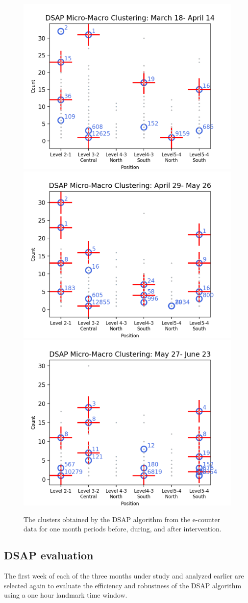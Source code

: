 \begin{figure}[!t]
    \centering
    \includegraphics[width=.47\textwidth]{image/Chapters/Chapter6/BeforeInte1month.png}
    \includegraphics[width=.47\textwidth]{image/Chapters/Chapter6/duringInte1month.png}
    \includegraphics[width=.47\textwidth]{image/Chapters/Chapter6/afterInte1month.png}
    \caption{The clusters obtained by the DSAP algorithm from the e-counter data for one month periods before, during, and after intervention.}
    \label{dsap3mon}
\end{figure}


\subsection{DSAP evaluation}


The first week of each of the three months under study and analyzed earlier are selected again to evaluate the efficiency and robustness of the DSAP algorithm using a one hour landmark time window. 

